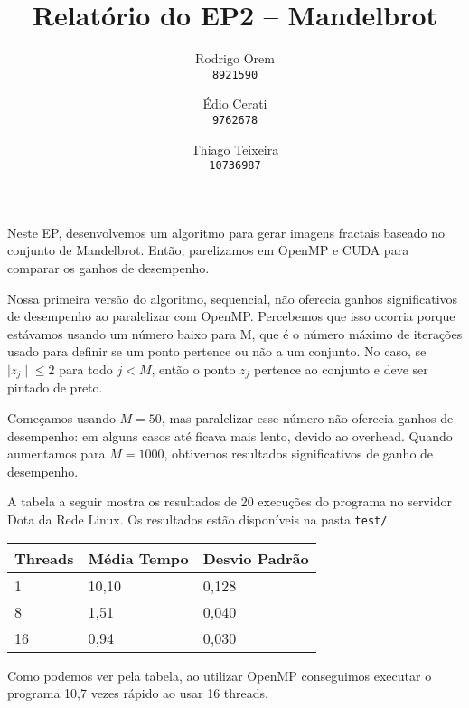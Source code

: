 \documentclass[11pt]{article}
\begin{document}
\author{
    Rodrigo Orem\\
    \texttt{8921590}
    \and
    Édio Cerati\\
    \texttt{9762678}
    \and
    Thiago Teixeira\\
    \texttt{10736987}
}

\title{\vspace{-2em}Relatório do EP2 -- Mandelbrot}
\maketitle

Neste EP, desenvolvemos um algoritmo para gerar imagens fractais baseado
no conjunto de Mandelbrot. Então, parelizamos em OpenMP e CUDA para
comparar os ganhos de desempenho.

Nossa primeira versão do algoritmo, sequencial, não oferecia ganhos
significativos de desempenho ao paralelizar com OpenMP. Percebemos que
isso ocorria porque estávamos usando um número baixo para M, que é o
número máximo de iterações usado para definir se um ponto pertence ou
não a um conjunto. No caso, se $|z_j∣ \leq 2$ para todo $j < M$, então o
ponto $z_j$ pertence ao conjunto e deve ser pintado de preto.

Começamos usando $M=50$, mas paralelizar esse número não oferecia ganhos
de desempenho: em alguns casos até ficava mais lento, devido ao
overhead. Quando aumentamos para $M=1000$, obtivemos resultados
significativos de ganho de desempenho.

A tabela a seguir mostra os resultados de 20 execuções do programa no
servidor Dota da Rede Linux. Os resultados estão disponíveis na pasta
{\tt test/}.

\begin{table}[h!]
\centering
\begin{tabular}{lll}
\hline
\multicolumn{1}{c}{Threads} &
\multicolumn{1}{l}{Média Tempo} &
\multicolumn{1}{l}{Desvio Padrão} \\
\hline
1 & 10,10 & 0,128 \\
8 & 1,51 & 0,040 \\
16 & 0,94 & 0,030
\end{tabular}
\end{table}

Como podemos ver pela tabela, ao utilizar OpenMP conseguimos executar o
programa 10,7 vezes rápido ao usar 16 threads.
\end{document}

